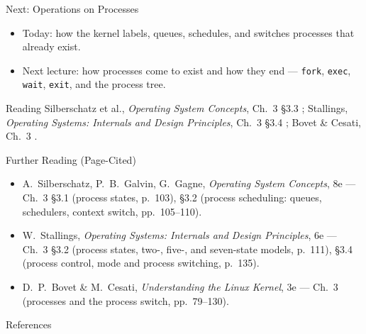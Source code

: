 \documentclass[aspectratio=169]{beamer}
\begin{document}
\begin{frame}{Next: Operations on Processes}
  \begin{itemize}
    \item Today: how the kernel labels, queues, schedules, and switches
      processes that already exist.
    \item Next lecture: how processes come to exist and how they end ---
      \texttt{fork}, \texttt{exec}, \texttt{wait}, \texttt{exit}, and the
      process tree.
  \end{itemize}
  \vspace{0.3cm}
  \begin{block}{Reading}
    Silberschatz et al., \emph{Operating System Concepts}, Ch.~3 \S3.3
    \cite{SilberschatzOSC_operating_system_concepts}; Stallings,
    \emph{Operating Systems: Internals and Design Principles}, Ch.~3 \S3.4
    \cite{StallingsOS_internals_design_principles}; Bovet \& Cesati, Ch.~3
    \cite{BovetCesati_understanding_linux_kernel}.
  \end{block}
\end{frame}

\begin{frame}{Further Reading (Page-Cited)}
  \footnotesize
  \begin{itemize}
    \item A.~Silberschatz, P.~B.~Galvin, G.~Gagne, \emph{Operating System
      Concepts}, 8e --- Ch.~3 \S3.1 (process states, p.~103), \S3.2
      (process scheduling: queues, schedulers, context switch, pp.~105--110).
    \item W.~Stallings, \emph{Operating Systems: Internals and Design
      Principles}, 6e --- Ch.~3 \S3.2 (process states, two-, five-, and
      seven-state models, p.~111), \S3.4 (process control, mode and process
      switching, p.~135).
    \item D.~P.~Bovet \& M.~Cesati, \emph{Understanding the Linux Kernel}, 3e
      --- Ch.~3 (processes and the process switch, pp.~79--130).
  \end{itemize}
  \vspace{0.2cm}
\end{frame}

\begin{frame}[allowframebreaks]{References}
  \footnotesize
  
  
\end{frame}
\end{document}
